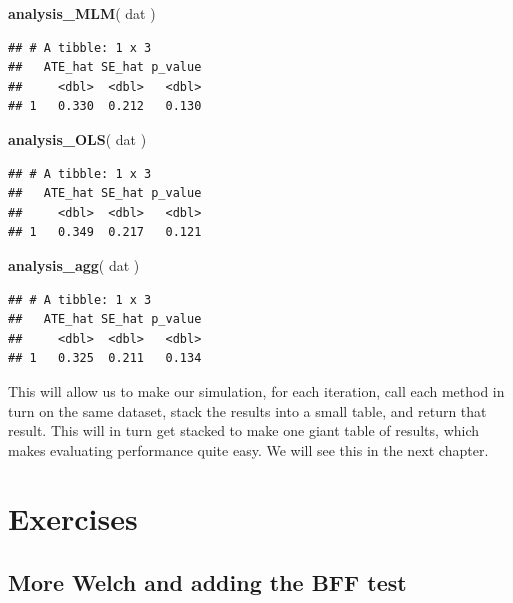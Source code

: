 \documentclass[
]{book}
\newenvironment{Shaded}{\begin{snugshade}}{\end{snugshade}}
\newcommand{\FunctionTok}[1]{\textcolor[rgb]{0.13,0.29,0.53}{\textbf{#1}}}
\newcommand{\NormalTok}[1]{#1}
\begin{document}
\begin{Shaded}
\begin{Highlighting}[]
\FunctionTok{analysis\_MLM}\NormalTok{( dat )}
\end{Highlighting}
\end{Shaded}

\begin{verbatim}
## # A tibble: 1 x 3
##   ATE_hat SE_hat p_value
##     <dbl>  <dbl>   <dbl>
## 1   0.330  0.212   0.130
\end{verbatim}

\begin{Shaded}
\begin{Highlighting}[]
\FunctionTok{analysis\_OLS}\NormalTok{( dat )}
\end{Highlighting}
\end{Shaded}

\begin{verbatim}
## # A tibble: 1 x 3
##   ATE_hat SE_hat p_value
##     <dbl>  <dbl>   <dbl>
## 1   0.349  0.217   0.121
\end{verbatim}

\begin{Shaded}
\begin{Highlighting}[]
\FunctionTok{analysis\_agg}\NormalTok{( dat )}
\end{Highlighting}
\end{Shaded}

\begin{verbatim}
## # A tibble: 1 x 3
##   ATE_hat SE_hat p_value
##     <dbl>  <dbl>   <dbl>
## 1   0.325  0.211   0.134
\end{verbatim}

This will allow us to make our simulation, for each iteration, call each method in turn on the same dataset, stack the results into a small table, and return that result.
This will in turn get stacked to make one giant table of results, which makes evaluating performance quite easy.
We will see this in the next chapter.

\section{Exercises}\label{exercises-4}

\subsection{More Welch and adding the BFF test}\label{more-welch-and-adding-the-bff-test}
\end{document}
